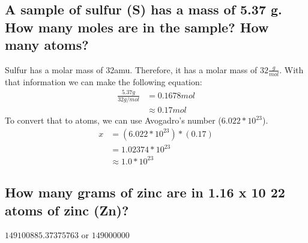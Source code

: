 \documentclass[11pt]{article}
\begin{document}
\subsection{A sample of sulfur (S) has a mass of 5.37 g. How many moles are in the sample? How many atoms?}
\label{sec:org629d0d1}
Sulfur has a molar mass of 32amu. Therefore, it has a molar mass of
\(32\frac{g}{mol}\).
With that information we can make the following equation:
\begin{align*}
\frac{5.37g}{32g/mol}&=0.1678mol\\
&\approx0.17mol
\end{align*}
To convert that to atoms, we can use Avogadro's number (\(6.022 *10^{23}\)).
\begin{align*}
x&=(6.022*10^{23})*(0.17)\\
&=1.02374*10^{23}\\
&\approx1.0*10^{23}
\end{align*}

\subsection{How many grams of zinc are in 1.16 x 10 22 atoms of zinc (Zn)?}
\label{sec:orgc7f3fa6}
\(149100885.37375763\) or \(149000000\)
\end{document}
